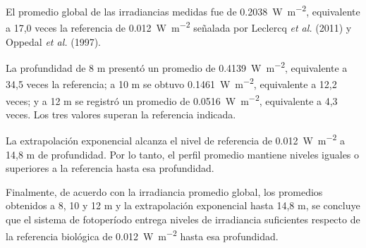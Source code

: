 \documentclass[11pt,letterpaper]{article}
\begin{document}
El promedio global de las irradiancias medidas fue de \SI{0.2038}{\watt\per\square\metre}, equivalente a 17,0 veces la referencia de \SI{0.012}{\watt\per\square\metre} señalada por Leclercq \emph{et al.} (2011) y Oppedal \emph{et al.} (1997).

La profundidad de 8 m presentó un promedio de \SI{0.4139}{\watt\per\square\metre}, equivalente a 34,5 veces la referencia; a 10 m se obtuvo \SI{0.1461}{\watt\per\square\metre}, equivalente a 12,2 veces; y a 12 m se registró un promedio de \SI{0.0516}{\watt\per\square\metre}, equivalente a 4,3 veces. Los tres valores superan la referencia indicada.

La extrapolación exponencial alcanza el nivel de referencia de \SI{0.012}{\watt\per\square\metre} a 14,8 m de profundidad. Por lo tanto, el perfil promedio mantiene niveles iguales o superiores a la referencia hasta esa profundidad.

Finalmente, de acuerdo con la irradiancia promedio global, los promedios obtenidos a 8, 10 y 12 m y la extrapolación exponencial hasta 14,8 m, se concluye que el sistema de fotoperíodo entrega niveles de irradiancia suficientes respecto de la referencia biológica de \SI{0.012}{\watt\per\square\metre} hasta esa profundidad.
\end{document}
